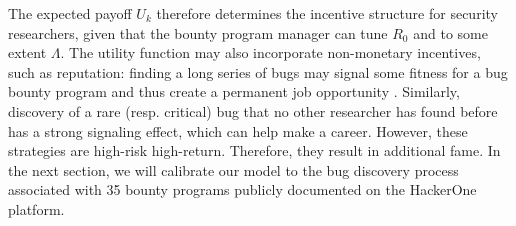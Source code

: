 The expected payoff $U_k$ therefore determines the incentive structure for security researchers, given that the bounty program manager can tune $R_0$ and to some extent $\Lambda$. The utility function may also incorporate non-monetary incentives, such as reputation: finding a long series of bugs may signal some fitness for a bug bounty program and thus create a permanent job opportunity \cite{moussouris2016}. Similarly, discovery of a rare (resp. critical) bug that no other researcher has found before has a strong signaling effect, which can help make a career. However, these strategies are high-risk high-return. Therefore, they result in additional fame. In the next section, we will calibrate our model to the bug discovery process associated with 35 bounty programs publicly documented on the HackerOne platform.





